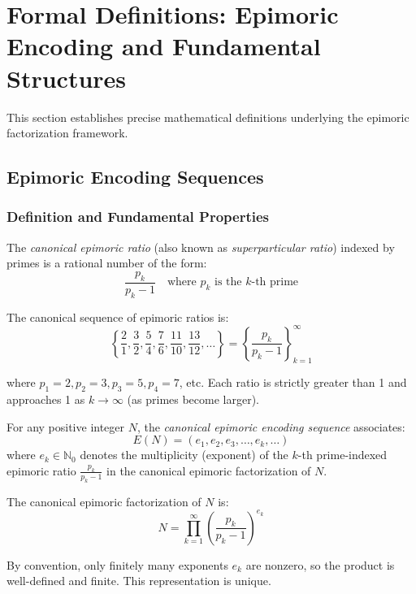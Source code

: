 \section{Formal Definitions: Epimoric Encoding and Fundamental Structures}
\label{sec:formal-definitions}

This section establishes precise mathematical definitions underlying the epimoric factorization framework.

\subsection{Epimoric Encoding Sequences}
\label{subsec:epimoric-encoding}

\subsubsection{Definition and Fundamental Properties}

\begin{definition}
\label{def:epimoric-ratio}
The \emph{canonical epimoric ratio} (also known as \emph{superparticular ratio}) indexed by primes is a rational number of the form:
\begin{equation}
\label{eq:epimoric-ratio}
\frac{p_k}{p_k - 1} \quad \text{where } p_k \text{ is the } k\text{-th prime}
\end{equation}

The canonical sequence of epimoric ratios is:
\begin{equation}
\left\{\frac{2}{1}, \frac{3}{2}, \frac{5}{4}, \frac{7}{6}, \frac{11}{10}, \frac{13}{12}, \ldots\right\} = \left\{\frac{p_k}{p_k - 1}\right\}_{k=1}^{\infty}
\end{equation}

where $p_1 = 2, p_2 = 3, p_3 = 5, p_4 = 7$, etc. Each ratio is strictly greater than 1 and approaches 1 as $k \to \infty$ (as primes become larger).
\end{definition}

\begin{definition}
\label{def:epimoric-encoding}
For any positive integer $N$, the \emph{canonical epimoric encoding sequence} associates:
\begin{equation}
\label{eq:def-epimoric-sequence}
E(N) = (e_1, e_2, e_3, \ldots, e_k, \ldots)
\end{equation}
where $e_k \in \mathbb{N}_0$ denotes the multiplicity (exponent) of the $k$-th prime-indexed epimoric ratio $\frac{p_k}{p_k - 1}$ in the canonical epimoric factorization of $N$.

The canonical epimoric factorization of $N$ is:
\begin{equation}
\label{eq:epimoric-product-form}
N = \prod_{k=1}^{\infty} \left(\frac{p_k}{p_k - 1}\right)^{e_k}
\end{equation}

By convention, only finitely many exponents $e_k$ are nonzero, so the product is well-defined and finite. This representation is unique.

\end{definition}

